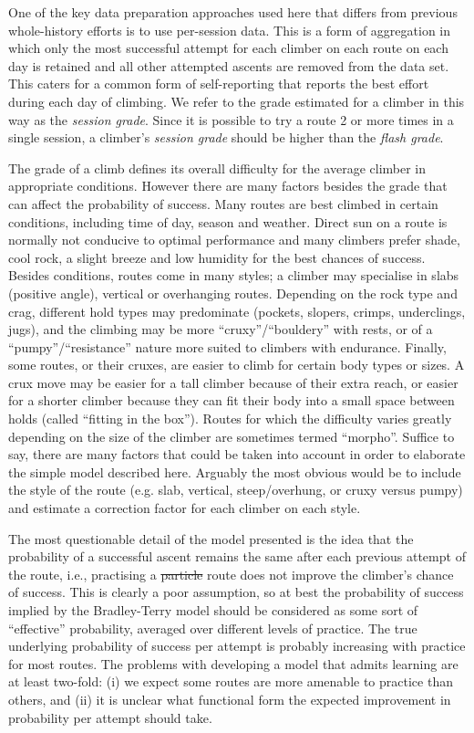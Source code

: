 \documentclass[12pt]{article}
\providecommand{\DIFaddtex}[1]{{\protect\color{blue}\uwave{#1}}} %
\providecommand{\DIFdeltex}[1]{{\protect\color{red}\sout{#1}}}                      %
\providecommand{\DIFaddbegin}{} %
\providecommand{\DIFaddend}{} %
\providecommand{\DIFdelbegin}{} %
\providecommand{\DIFdelend}{} %
\providecommand{\DIFadd}[1]{\texorpdfstring{\DIFaddtex{#1}}{#1}} %
\providecommand{\DIFdel}[1]{\texorpdfstring{\DIFdeltex{#1}}{}} %
\newcommand{\DIFscaledelfig}{0.5}
\newlength{\DIFdelgraphicswidth} %
\newlength{\DIFdelgraphicsheight} %
\newcommand{\DIFaddincludegraphics}[2][]{{\color{blue}\fbox{\DIFOincludegraphics[#1]{#2}}}} %
\newcommand{\DIFdelincludegraphics}[2][]{%
\sbox{\DIFdelgraphicsbox}{\DIFOincludegraphics[#1]{#2}}%
\settoboxwidth{\DIFdelgraphicswidth}{\DIFdelgraphicsbox} %
\settoboxtotalheight{\DIFdelgraphicsheight}{\DIFdelgraphicsbox} %
\scalebox{\DIFscaledelfig}{%
\parbox[b]{\DIFdelgraphicswidth}{\usebox{\DIFdelgraphicsbox}\\[-\baselineskip] \rule{\DIFdelgraphicswidth}{0em}}\llap{\resizebox{\DIFdelgraphicswidth}{\DIFdelgraphicsheight}{%
\setlength{\unitlength}{\DIFdelgraphicswidth}%
\begin{picture}(1,1)%
\thicklines\linethickness{2pt} %
{\color[rgb]{1,0,0}\put(0,0){\framebox(1,1){}}}%
{\color[rgb]{1,0,0}\put(0,0){\line( 1,1){1}}}%
{\color[rgb]{1,0,0}\put(0,1){\line(1,-1){1}}}%
\end{picture}%
}\hspace*{3pt}}} %
} %
\DeclareRobustCommand{\DIFaddbegin}{\DIFOaddbegin \let\includegraphics\DIFaddincludegraphics} %
\DeclareRobustCommand{\DIFaddend}{\DIFOaddend \let\includegraphics\DIFOincludegraphics} %
\DeclareRobustCommand{\DIFdelbegin}{\DIFOdelbegin \let\includegraphics\DIFdelincludegraphics} %
\DeclareRobustCommand{\DIFdelend}{\DIFOaddend \let\includegraphics\DIFOincludegraphics} %
\begin{document}
One of the key data preparation approaches used here that differs from previous whole-history efforts is to use per-session data. This is a form of aggregation in which only the most successful attempt for each climber on each route on each day is retained and all other attempted ascents are removed from the data set. This caters for a common form of self-reporting that reports the best effort during each day of climbing. We refer to the grade estimated for a climber in this way as the {\it session grade}. Since it is possible to try a route 2 or more times in a single session, a climber's {\it session grade} should be higher than the {\it flash grade}.

The grade of a climb defines its overall difficulty for the average climber in appropriate conditions. However there are many factors besides the grade that can affect the probability of success. Many routes are best climbed in certain conditions, including time of day, season and weather. Direct sun on a route is normally not conducive to optimal performance and many climbers prefer shade, cool rock, a slight breeze and low humidity for the best chances of success. Besides conditions, routes come in many styles; a climber may specialise in slabs (positive angle), vertical or overhanging routes. Depending on the rock type and crag, different hold types may predominate (pockets, slopers, crimps, underclings, jugs), and the climbing may be more ``cruxy''/``bouldery'' with rests, or of a ``pumpy''/``resistance'' nature more suited to climbers with endurance. Finally, some routes, or their cruxes, are easier to climb for certain body types or sizes. A crux move may be easier for a tall climber because of their extra reach, or easier for a shorter climber because they can fit their body into a small space between holds (called ``fitting in the box''). Routes for which the difficulty varies greatly depending on the size of the climber are sometimes termed ``morpho''. Suffice to say, there are many factors that could be taken into account in order to elaborate the simple model described here. Arguably the most obvious would be to include the style of the route (e.g. slab, vertical, steep/overhung, or cruxy versus pumpy) and estimate a correction factor for each climber on each style.

The most questionable detail of the model presented is the idea that the probability of a successful ascent remains the same after each previous attempt of the route, i.e., practising a \DIFdelbegin \DIFdel{particle }\DIFdelend \DIFaddbegin \DIFadd{particular }\DIFaddend route does not improve the climber's chance of success. This is clearly a poor assumption, so at best the probability of success implied by the Bradley-Terry model should be considered as some sort of ``effective'' probability, averaged over different levels of practice. The true underlying probability of success per attempt is probably increasing with practice for most routes. The problems with developing a model that admits learning are at least two-fold: (i) we expect some routes are more amenable to practice than others, and (ii) it is unclear what functional form the expected improvement in probability per attempt should take.
\end{document}
